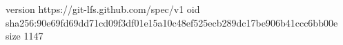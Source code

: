 version https://git-lfs.github.com/spec/v1
oid sha256:90e69fd69dd71cd09f3df01e15a10c48ef525ecb289dc17be906b41ccc6bb00e
size 1147
